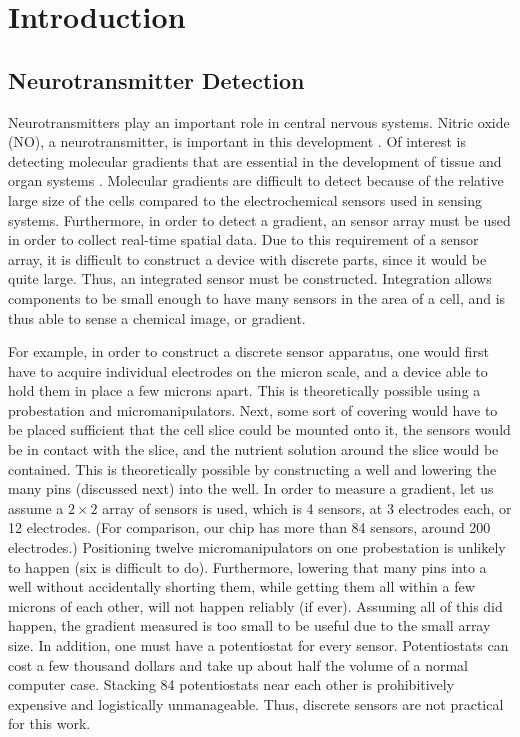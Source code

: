 \chapter{Introduction}

\section{Neurotransmitter Detection}

Neurotransmitters play an important role in central nervous systems. Nitric oxide (NO), a neurotransmitter, is important in this development \cite{bicker2005sag, bulotta2005css, contestabile2004rno}. Of interest is detecting molecular gradients that are essential in the development of tissue and organ systems \cite{wolpert1996ohy, gurdon2001mgi}. Molecular gradients are difficult to detect because of the relative large size of the cells compared to the electrochemical sensors used in sensing systems. Furthermore, in order to detect a gradient, an sensor array must be used in order to collect real-time spatial data. Due to this requirement of a sensor array, it is difficult to construct a device with discrete parts, since it would be quite large. Thus, an integrated sensor must be constructed. Integration allows components to be small enough to have many sensors in the area of a cell, and is thus able to sense a chemical image, or gradient.

For example, in order to construct a discrete sensor apparatus, one would first have to acquire individual electrodes on the micron scale, and a device able to hold them in place a few microns apart. This is theoretically possible using a probestation and micromanipulators. Next, some sort of covering would have to be placed sufficient that the cell slice could be mounted onto it, the sensors would be in contact with the slice, and the nutrient solution around the slice would be contained. This is theoretically possible by constructing a well and lowering the many pins (discussed next) into the well. In order to measure a gradient, let us assume a $2 \times 2$ array of sensors is used, which is 4 sensors, at 3 electrodes each, or 12 electrodes. (For comparison, our chip has more than 84 sensors, around 200 electrodes.) Positioning twelve micromanipulators on one probestation is unlikely to happen (six is difficult to do). Furthermore, lowering that many pins into a well without accidentally shorting them, while getting them all within a few microns of each other, will not happen reliably (if ever). Assuming all of this did happen, the gradient measured is too small to be useful due to the small array size. In addition, one must have a potentiostat for every sensor. Potentiostats can cost a few thousand dollars and take up about half the volume of a normal computer case. Stacking 84 potentiostats near each other is prohibitively expensive and logistically unmanageable. Thus, discrete sensors are not practical for this work.

